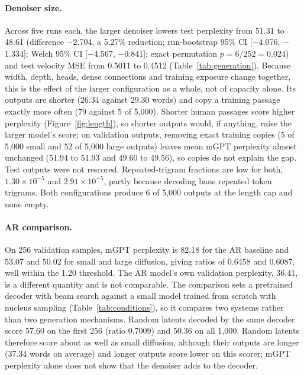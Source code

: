 \documentclass[11pt,a4paper]{article}
\begin{document}
\paragraph{Denoiser size.}
Across five runs each, the larger denoiser lowers test perplexity from 51.31 to 48.61 (difference $-$2.704, a 5.27\% reduction; run-bootstrap 95\% CI [$-$4.076, $-$1.334]; Welch 95\% CI [$-$4.567, $-$0.841]; exact permutation $p = 6/252 = 0.024$) and test velocity MSE from 0.5011 to 0.4512 (Table~\ref{tab:generation}). Because width, depth, heads, dense connections and training exposure change together, this is the effect of the larger configuration as a whole, not of capacity alone. Its outputs are shorter (26.34 against 29.30 words) and copy a training passage exactly more often (79 against 5 of 5,000). Shorter human passages score higher perplexity (Figure~\ref{fig:length}), so shorter outputs would, if anything, raise the larger model's score; on validation outputs, removing exact training copies (5 of 5,000 small and 52 of 5,000 large outputs) leaves mean mGPT perplexity almost unchanged (51.94 to 51.93 and 49.60 to 49.56), so copies do not explain the gap. Test outputs were not rescored. Repeated-trigram fractions are low for both, $1.30\times10^{-5}$ and $2.91\times10^{-5}$, partly because decoding bans repeated token trigrams. Both configurations produce 6 of 5,000 outputs at the length cap and none empty.

\paragraph{AR comparison.}
On 256 validation samples, mGPT perplexity is 82.18 for the AR baseline and 53.07 and 50.02 for small and large diffusion, giving ratios of 0.6458 and 0.6087, well within the 1.20 threshold. The AR model's own validation perplexity, 36.41, is a different quantity and is not comparable. The comparison sets a pretrained decoder with beam search against a small model trained from scratch with nucleus sampling (Table~\ref{tab:conditions}), so it compares two systems rather than two generation mechanisms. Random latents decoded by the same decoder score 57.60 on the first 256 (ratio 0.7009) and 50.36 on all 1,000. Random latents therefore score about as well as small diffusion, although their outputs are longer (37.34 words on average) and longer outputs score lower on this scorer; mGPT perplexity alone does not show that the denoiser adds to the decoder.
\end{document}
